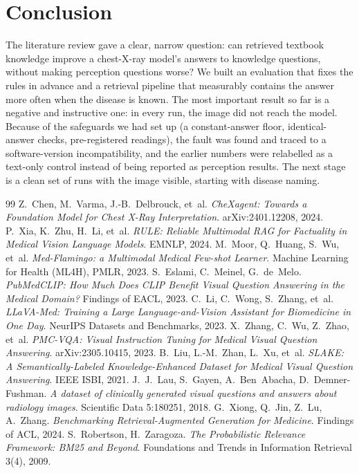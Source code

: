 \documentclass[11pt,a4paper]{article}
\begin{document}
\section{Conclusion}
The literature review gave a clear, narrow question: can retrieved textbook knowledge improve a chest-X-ray model's answers
to knowledge questions, without making perception questions worse? We built an evaluation that fixes the rules in advance and
a retrieval pipeline that measurably contains the answer more often when the disease is known.
The most important result so far is a negative and instructive one: in every run, the image did not reach the model. Because of
the safeguards we had set up (a constant-answer floor, identical-answer checks, pre-registered readings), the fault was
found and traced to a software-version incompatibility, and the earlier numbers were relabelled as a text-only control instead
of being reported as perception results.
The next stage is a clean set of runs with the image visible, starting with disease naming.

\begin{thebibliography}{99}\small
\setlength{\itemsep}{0.2em}
 Z.~Chen, M.~Varma, J.-B.~Delbrouck, et~al. \emph{CheXagent: Towards a Foundation Model for Chest X-Ray Interpretation}. arXiv:2401.12208, 2024.
 P.~Xia, K.~Zhu, H.~Li, et~al. \emph{RULE: Reliable Multimodal RAG for Factuality in Medical Vision Language Models}. EMNLP, 2024.
 M.~Moor, Q.~Huang, S.~Wu, et~al. \emph{Med-Flamingo: a Multimodal Medical Few-shot Learner}. Machine Learning for Health (ML4H), PMLR, 2023.
 S.~Eslami, C.~Meinel, G.~de~Melo. \emph{PubMedCLIP: How Much Does CLIP Benefit Visual Question Answering in the Medical Domain?} Findings of EACL, 2023.
 C.~Li, C.~Wong, S.~Zhang, et~al. \emph{LLaVA-Med: Training a Large Language-and-Vision Assistant for Biomedicine in One Day}. NeurIPS Datasets and Benchmarks, 2023.
 X.~Zhang, C.~Wu, Z.~Zhao, et~al. \emph{PMC-VQA: Visual Instruction Tuning for Medical Visual Question Answering}. arXiv:2305.10415, 2023.
 B.~Liu, L.-M.~Zhan, L.~Xu, et~al. \emph{SLAKE: A Semantically-Labeled Knowledge-Enhanced Dataset for Medical Visual Question Answering}. IEEE ISBI, 2021.
 J.~J.~Lau, S.~Gayen, A.~Ben~Abacha, D.~Demner-Fushman. \emph{A dataset of clinically generated visual questions and answers about radiology images}. Scientific Data 5:180251, 2018.
 G.~Xiong, Q.~Jin, Z.~Lu, A.~Zhang. \emph{Benchmarking Retrieval-Augmented Generation for Medicine}. Findings of ACL, 2024.
 S.~Robertson, H.~Zaragoza. \emph{The Probabilistic Relevance Framework: BM25 and Beyond}. Foundations and Trends in Information Retrieval 3(4), 2009.
\end{thebibliography}
\end{document}
